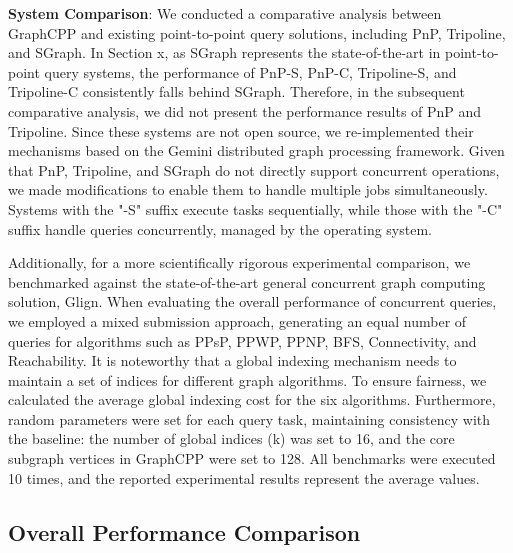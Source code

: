 \documentclass[lettersize,journal]{IEEEtran} %
\begin{document}
{\bf{System Comparison}}: We conducted a comparative analysis between GraphCPP and existing point-to-point query solutions, including PnP\cite{pnp}, Tripoline\cite{tripoline}, and SGraph\cite{sgraph}. In Section x, as SGraph represents the state-of-the-art in point-to-point query systems, the performance of PnP-S, PnP-C, Tripoline-S, and Tripoline-C consistently falls behind SGraph. Therefore, in the subsequent comparative analysis, we did not present the performance results of PnP and Tripoline. Since these systems are not open source, we re-implemented their mechanisms based on the Gemini distributed graph processing framework. Given that PnP, Tripoline, and SGraph do not directly support concurrent operations, we made modifications to enable them to handle multiple jobs simultaneously. Systems with the "-S" suffix execute tasks sequentially, while those with the "-C" suffix handle queries concurrently, managed by the operating system.

Additionally, for a more scientifically rigorous experimental comparison, we benchmarked against the state-of-the-art general concurrent graph computing solution, Glign. When evaluating the overall performance of concurrent queries, we employed a mixed submission approach, generating an equal number of queries for algorithms such as PPsP, PPWP, PPNP, BFS, Connectivity, and Reachability. It is noteworthy that a global indexing mechanism needs to maintain a set of indices for different graph algorithms. To ensure fairness, we calculated the average global indexing cost for the six algorithms. Furthermore, random parameters were set for each query task, maintaining consistency with the baseline: the number of global indices (k) was set to 16, and the core subgraph vertices in GraphCPP were set to 128. All benchmarks were executed 10 times, and the reported experimental results represent the average values.
 

\subsection{Overall Performance Comparison}
\end{document}
